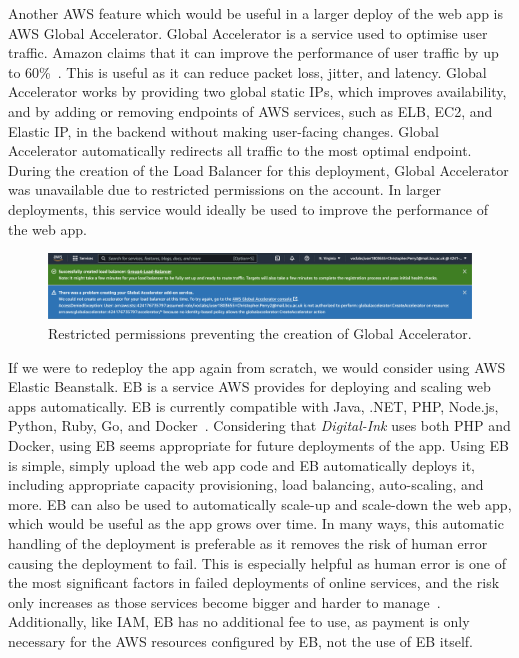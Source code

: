 \clearpage
Another AWS feature which would be useful in a larger deploy of the web app is AWS Global Accelerator.
Global Accelerator is a service used to optimise user traffic.
Amazon claims that it can improve the performance of user traffic by up to 60\%~\parencite{amazon2022aws4}.
This is useful as it can reduce packet loss, jitter, and latency.
Global Accelerator works by providing two global static IPs, which improves availability, and by adding or removing
endpoints of AWS services, such as ELB, EC2, and Elastic IP, in the backend without making user-facing changes.
Global Accelerator automatically redirects all traffic to the most optimal endpoint.
During the creation of the Load Balancer for this deployment, Global Accelerator was unavailable due to
restricted permissions on the account.
In larger deployments, this service would ideally be used to improve the performance of the web app.

\begin{figure}[!htbp]
    \centering
    \includegraphics[width=\textwidth]{resources/elb/elb-accelerator}
    \caption{Restricted permissions preventing the creation of Global Accelerator.}
    \label{fig:elb-accelerator}
\end{figure}

If we were to redeploy the app again from scratch, we would consider using AWS Elastic Beanstalk.
EB is a service AWS provides for deploying and scaling web apps automatically.
EB is currently compatible with Java, .NET, PHP, Node.js, Python, Ruby, Go, and Docker~\parencite{amazon2022aws3}.
Considering that \textit{Digital-Ink} uses both PHP and Docker, using EB seems appropriate for future
deployments of the app.
Using EB is simple, simply upload the web app code and EB automatically deploys it, including appropriate
capacity provisioning, load balancing, auto-scaling, and more.
EB can also be used to automatically scale-up and scale-down the web app, which would be useful as the app
grows over time.
In many ways, this automatic handling of the deployment is preferable as it removes the risk of human error
causing the deployment to fail.
This is especially helpful as human error is one of the most significant factors in failed deployments of online
services, and the risk only increases as those services become bigger and harder to manage~\autocite{kraemer2007human}.
Additionally, like IAM, EB has no additional fee to use, as payment is only necessary for the AWS resources
configured by EB, not the use of EB itself.
